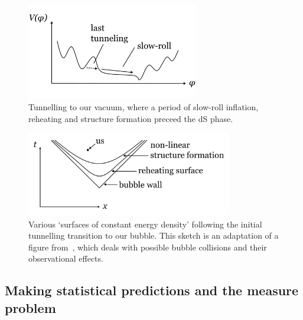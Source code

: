 \documentclass[12pt]{article}
\numberwithin{equation}{section}
\begin{document}
\begin{figure}[ht]
\begin{center} 
\includegraphics[width=7.5cm]{slow-roll.png}
\caption{Tunnelling to our vacuum, where a period of slow-roll inflation, reheating and structure formation preceed the dS phase.}
\label{slow-roll} 
\end{center}
\end{figure}

\begin{figure}[ht]
\begin{center} 
\includegraphics[width=9cm]{reheating.png}
\caption{Various `surfaces of constant energy density' following the initial tunnelling transition to our bubble. This sketch is an adaptation of a figure from~\cite{Kleban:2011pg}, which deals with possible bubble collisions and their observational effects.}
\label{reheating} 
\end{center}
\end{figure}






\subsection{Making statistical predictions and the measure problem}
\end{document}
